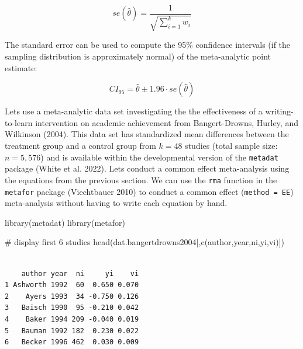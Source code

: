 \documentclass[
  letterpaper,
  DIV=11,
  numbers=noendperiod]{scrreprt}
\newenvironment{Shaded}{}{}
\newcommand{\CommentTok}[1]{\textcolor[rgb]{0.54,0.53,0.53}{#1}}
\newcommand{\FunctionTok}[1]{\textcolor[rgb]{0.39,0.29,0.61}{#1}}
\newcommand{\NormalTok}[1]{\textcolor[rgb]{0.12,0.11,0.11}{#1}}
\newcommand{\StringTok}[1]{\textcolor[rgb]{0.75,0.01,0.01}{#1}}
\begin{document}
\[
se(\hat{\theta}) = \frac{1}{\sqrt{\sum^k_{i=1} w_i}}
\]

The standard error can be used to compute the 95\% confidence intervals
(if the sampling distribution is approximately normal) of the
meta-analytic point estimate:

\[
CI_{95} = \hat{\theta}\pm 1.96 \cdot se(\hat{\theta})
\]

\begin{tcolorbox}[enhanced jigsaw, toptitle=1mm, titlerule=0mm, arc=.35mm, breakable, colframe=quarto-callout-note-color-frame, title={Applied Example in R}, opacitybacktitle=0.6, opacityback=0, colbacktitle=quarto-callout-note-color!10!white, coltitle=black, bottomtitle=1mm, colback=white, bottomrule=.15mm, rightrule=.15mm, toprule=.15mm, leftrule=.75mm, left=2mm]

Lets use a meta-analytic data set investigating the the effectiveness of
a writing-to-learn intervention on academic achievement from
Bangert-Drowns, Hurley, and Wilkinson (2004). This data set has
standardized mean differences between the treatment group and a control
group from \(k=48\) studies (total sample size: \(n=5,576\)) and is
available within the developmental version of the \texttt{metadat}
package (White et al. 2022). Lets conduct a common effect meta-analysis
using the equations from the previous section. We can use the
\texttt{rma} function in the \texttt{metafor} package (Viechtbauer 2010)
to conduct a common effect
(\texttt{method\ =\ \textquotesingle{}EE\textquotesingle{}})
meta-analysis without having to write each equation by hand.

\begin{Shaded}
\begin{Highlighting}[]
\FunctionTok{library}\NormalTok{(metadat)}
\FunctionTok{library}\NormalTok{(metafor)}

\CommentTok{\# display first 6 studies}
\FunctionTok{head}\NormalTok{(dat.bangertdrowns2004[,}\FunctionTok{c}\NormalTok{(}\StringTok{\textquotesingle{}author\textquotesingle{}}\NormalTok{,}\StringTok{\textquotesingle{}year\textquotesingle{}}\NormalTok{,}\StringTok{\textquotesingle{}ni\textquotesingle{}}\NormalTok{,}\StringTok{\textquotesingle{}yi\textquotesingle{}}\NormalTok{,}\StringTok{\textquotesingle{}vi\textquotesingle{}}\NormalTok{)])}
\end{Highlighting}
\end{Shaded}

\begin{verbatim}

    author year  ni     yi    vi 
1 Ashworth 1992  60  0.650 0.070 
2    Ayers 1993  34 -0.750 0.126 
3   Baisch 1990  95 -0.210 0.042 
4    Baker 1994 209 -0.040 0.019 
5   Bauman 1992 182  0.230 0.022 
6   Becker 1996 462  0.030 0.009 
\end{verbatim}


\end{tcolorbox}
\end{document}
